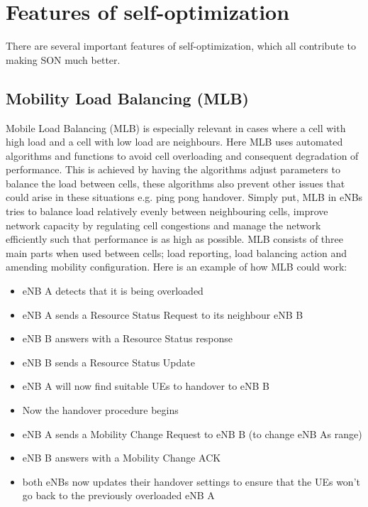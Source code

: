 \documentclass{report}
\begin{document}
\section{Features of self-optimization}
There are several important features of self-optimization, which all contribute to making SON much better. 

\subsection{Mobility Load Balancing (MLB)}
Mobile Load Balancing (MLB) is especially relevant in cases where a cell with high load and a cell with low load are neighbours. Here MLB uses automated algorithms and functions to avoid cell overloading and consequent degradation of performance. This is achieved by having the algorithms adjust parameters to balance the load between cells, these algorithms also prevent other issues that could arise in these situations e.g. ping pong handover. 
Simply put, MLB in eNBs tries to balance load relatively evenly between neighbouring cells, improve network capacity by regulating cell congestions and manage the network efficiently such that performance is as high as possible.
MLB consists of three main parts when used between cells; load reporting, load balancing action and amending mobility configuration.
Here is an example of how MLB could work:
\begin{itemize}
	\item eNB A detects that it is being overloaded
	\item eNB A sends a Resource Status Request to its neighbour eNB B
	\item eNB B answers with a Resource Status response
	\item eNB B sends a Resource Status Update
	\item eNB A will now find suitable UEs to handover to eNB B
	\item Now the handover procedure begins
	\item eNB A sends a Mobility Change Request to eNB B (to change eNB As range)
	\item eNB B answers with a Mobility Change ACK
	\item both eNBs now updates their handover settings to ensure that the UEs won't go back to the previously overloaded eNB A \cite{Sartori2012}
\end{itemize}
\end{document}
